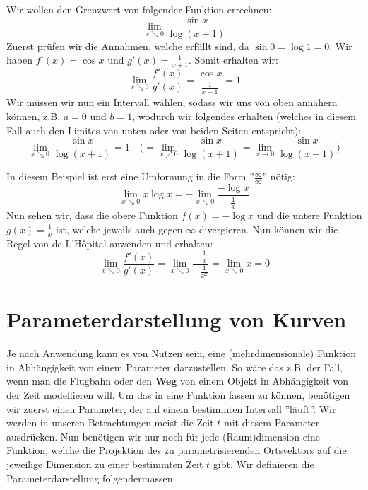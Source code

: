 \begin{example} Wir wollen den Grenzwert von folgender Funktion errechnen:
$$\lim_{x \searrow 0}\frac{\sin x}{\log (x + 1)}$$
Zuerst prüfen wir die Annahmen, welche erfüllt sind, da $\sin 0 = \log 1 = 0$. Wir haben $f'(x) = \cos x$ und $g'(x)= \frac{1}{x+1}$. Somit erhalten wir:
$$\lim_{x \searrow 0} \frac{f'(x)}{g'(x)} = \frac{\cos x}{\frac{1}{x+1}} = 1$$
Wir müssen wir nun ein Intervall wählen, sodass wir uns von oben annähern können, z.B. $a = 0$ und $b = 1$, wodurch wir folgendes erhalten (welches in diesem Fall auch den Limites von unten oder von beiden Seiten entspricht):
$$\lim_{x \searrow 0}\frac{\sin x}{\log (x+1)} = 1 \quad \Big( = \lim_{x \nearrow 0}\frac{\sin x}{\log (x+1)} = \lim_{x \to 0}\frac{\sin x}{\log (x+1)} \Big)$$
\end{example}
\begin{example} In diesem Beispiel ist erst eine Umformung in die Form ''$\frac{\infty}{\infty}$'' nötig:
$$\lim_{x \searrow 0} x \log x = -\lim_{x \searrow 0}\frac{-\log x}{\frac{1}{x}}$$
Nun sehen wir, dass die obere Funktion $f(x) = -\log x$ und die untere Funktion $g(x) = \frac{1}{x}$ ist, welche jeweils auch gegen $\infty$ divergieren. Nun können wir die Regel von de L'Hôpital anwenden und erhalten:
$$\lim_{x \searrow 0} \frac{f'(x)}{g'(x)} = \lim_{x \searrow 0} \frac{-\frac{1}{x}}{-\frac{1}{x^2}}=\lim_{x \searrow 0}x = 0$$
\end{example}

\section{Parameterdarstellung von Kurven}
Je nach Anwendung kann es von Nutzen sein, eine (mehrdimensionale) Funktion in Abhängigkeit von einem Parameter darzustellen. So wäre das z.B. der Fall, wenn man die Flugbahn oder den \textbf{Weg} von einem Objekt in Abhängigkeit von der Zeit modellieren will. Um das in eine Funktion fassen zu können, benötigen wir zuerst einen Parameter, der auf einem bestimmten Intervall ''läuft''. Wir werden in unseren Betrachtungen meist die Zeit $t$ mit diesem Parameter ausdrücken. Nun benötigen wir nur noch für jede (Raum)dimension eine Funktion, welche die Projektion des zu parametrisierenden Ortsvektors auf die jeweilige Dimension zu einer bestimmten Zeit $t$ gibt. Wir definieren die Parameterdarstellung folgendermassen:

